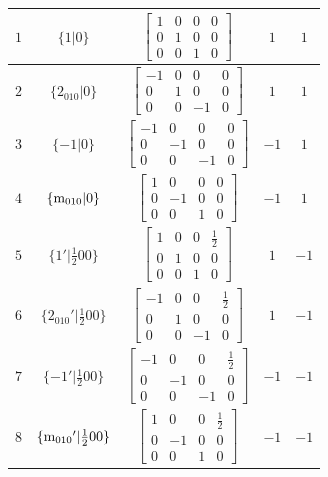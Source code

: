 \documentclass[fleqn,8pt]{jsarticle}
\begin{document}
\begin{longtable}{ccccc}
$ 1 $ & $ \{1|0\} $ & $ \begin{bmatrix} 1 & 0 & 0 & 0 \\ 0 & 1 & 0 & 0 \\ 0 & 0 & 1 & 0 \end{bmatrix} $ & $ 1 $ & $ 1 $ \\ \hline
$ 2 $ & $ \{2{}_{010}|0\} $ & $ \begin{bmatrix} -1 & 0 & 0 & 0 \\ 0 & 1 & 0 & 0 \\ 0 & 0 & -1 & 0 \end{bmatrix} $ & $ 1 $ & $ 1 $ \\ \hline
$ 3 $ & $ \{-1|0\} $ & $ \begin{bmatrix} -1 & 0 & 0 & 0 \\ 0 & -1 & 0 & 0 \\ 0 & 0 & -1 & 0 \end{bmatrix} $ & $ -1 $ & $ 1 $ \\ \hline
$ 4 $ & $ \{{\rm m}_{010}|0\} $ & $ \begin{bmatrix} 1 & 0 & 0 & 0 \\ 0 & -1 & 0 & 0 \\ 0 & 0 & 1 & 0 \end{bmatrix} $ & $ -1 $ & $ 1 $ \\ \hline
$ 5 $ & $ \{1{}'|\frac{1}{2} 0 0\} $ & $ \begin{bmatrix} 1 & 0 & 0 & \frac{1}{2} \\ 0 & 1 & 0 & 0 \\ 0 & 0 & 1 & 0 \end{bmatrix} $ & $ 1 $ & $ -1 $ \\ \hline
$ 6 $ & $ \{2{}_{010}{}'|\frac{1}{2} 0 0\} $ & $ \begin{bmatrix} -1 & 0 & 0 & \frac{1}{2} \\ 0 & 1 & 0 & 0 \\ 0 & 0 & -1 & 0 \end{bmatrix} $ & $ 1 $ & $ -1 $ \\ \hline
$ 7 $ & $ \{-1{}'|\frac{1}{2} 0 0\} $ & $ \begin{bmatrix} -1 & 0 & 0 & \frac{1}{2} \\ 0 & -1 & 0 & 0 \\ 0 & 0 & -1 & 0 \end{bmatrix} $ & $ -1 $ & $ -1 $ \\ \hline
$ 8 $ & $ \{{\rm m}_{010}{}'|\frac{1}{2} 0 0\} $ & $ \begin{bmatrix} 1 & 0 & 0 & \frac{1}{2} \\ 0 & -1 & 0 & 0 \\ 0 & 0 & 1 & 0 \end{bmatrix} $ & $ -1 $ & $ -1 $ \\
\end{longtable}
\end{document}
